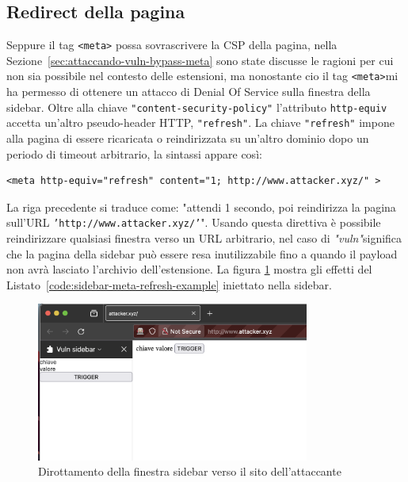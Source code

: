 \documentclass{sapthesis}
\newcommand{\code}[1]{\texttt{#1}}
\newcommand{\refSection}[1]{Sezione~\ref{#1}}
\newcommand{\refCode}[1]{Listato~\ref{#1}}
\newcommand{\vuln}{\textit{"vuln"}}
\newcommand{\tagHTML}[1]{\code{<#1>}}
\newcommand{\meta}{\tagHTML{meta}}
\begin{document}
        \subsection{Redirect della pagina}
            Seppure il tag \meta{} possa sovrascrivere la CSP della pagina, nella \refSection{sec:attaccando-vuln-bypass-meta}
            sono state discusse le ragioni per cui non sia possibile nel contesto delle estensioni, ma
            nonostante cio il tag \meta mi ha permesso di ottenere un attacco di Denial Of Service sulla finestra 
            della sidebar. Oltre alla chiave \code{"content-security-policy"}
            l'attributo \code{http-equiv} accetta un'altro pseudo-header HTTP, \code{"refresh"}. La chiave
            \code{"refresh"} impone alla pagina di essere ricaricata o reindirizzata su un'altro dominio dopo
            un periodo di timeout arbitrario, la sintassi appare così:
            \begin{lstlisting}[label=code:sidebar-meta-refresh-example]
<meta http-equiv="refresh" content="1; http://www.attacker.xyz/" >
\end{lstlisting}
            La riga precedente si traduce come: "attendi 1 secondo, poi reindirizza la pagina sull'URL 
            \code{'http://www.attacker.xyz/'}".
            Usando questa direttiva è possibile reindirizzare qualsiasi finestra verso un URL arbitrario,
            nel caso di \vuln significa che la pagina della sidebar può essere resa inutilizzabile fino a
            quando il payload non avrà lasciato l'archivio dell'estensione. La figura \ref{fig:sidebar-meta-refresh-1}
            mostra gli effetti del \refCode{code:sidebar-meta-refresh-example} iniettato nella sidebar.

            \begin{figure}
                \centering
                \includegraphics[width=0.8\textwidth]{sidebar-meta-refresh-1.png}
                \caption{Dirottamento della finestra sidebar verso il sito dell'attaccante}
                \label{fig:sidebar-meta-refresh-1}
            \end{figure}
\end{document}
